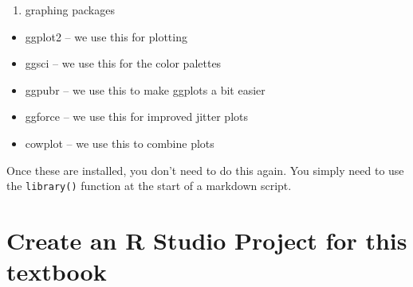 \documentclass[]{book}
\providecommand{\tightlist}{%
  \setlength{\itemsep}{0pt}\setlength{\parskip}{0pt}}
\begin{document}
\begin{enumerate}
\def\labelenumi{\arabic{enumi}.}
\setcounter{enumi}{2}
\tightlist
\item
  graphing packages
\end{enumerate}

\begin{itemize}
\tightlist
\item
  ggplot2 -- we use this for plotting
\item
  ggsci -- we use this for the color palettes
\item
  ggpubr -- we use this to make ggplots a bit easier
\item
  ggforce -- we use this for improved jitter plots
\item
  cowplot -- we use this to combine plots
\end{itemize}

Once these are installed, you don't need to do this again. You simply need to use the \texttt{library()} function at the start of a markdown script.

\hypertarget{create-an-r-studio-project-for-this-textbook}{%
\section{Create an R Studio Project for this textbook}\label{create-an-r-studio-project-for-this-textbook}}
\end{document}
